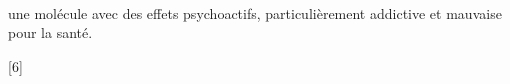 \nomPrenom

\begin{center}
  \chemfigHaworth{!\cocaineHaw} \\[8pt]
   une molécule avec des effets psychoactifs, particulièrement addictive et mauvaise pour la santé.
\end{center}

[6]